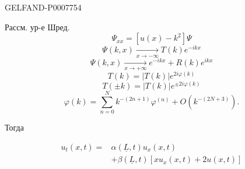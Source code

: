 \begin{GelfandAdjacentEvidence}{GELFAND-P000775}{4}


Рассм. ур-е Шред.
\begin{equation}
\Psi_{xx}=[u(x)-k^2]\Psi\tag{6}
\end{equation}
\[
\Psi(k,x)\underset{x\to-\infty}{\longrightarrow}T(k)e^{-ikx}
\]
\[
\Psi(k,x)\underset{x\to+\infty}{\longrightarrow}e^{-ikx}+R(k)e^{ikx}
\]
\[
T(k)=|T(k)|e^{2i\varphi(k)}
\]
\[
T(\pm k)=|T(k)|e^{\pm2i\varphi(k)}
\]
\begin{equation}
\varphi(k)=\sum_{n=0}^N k^{-(2n+1)}\varphi^{(n)}+O(k^{-(2N+3)}).\tag{7}
\end{equation}

Тогда
\end{GelfandAdjacentEvidence}

\begin{equation}
\begin{split}
u_t(x,t)={}&\alpha(\underline L,t)u_x(x,t)\\
&+\beta(\underline L,t)[xu_x(x,t)+2u(x,t)]
\end{split}\tag{9}
\end{equation}



